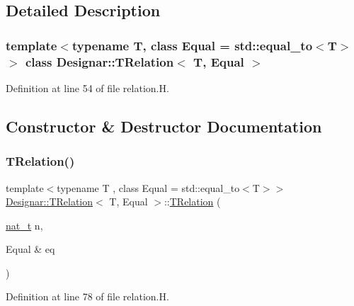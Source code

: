 \subsection{Detailed Description}
\subsubsection*{template$<$typename T, class Equal = std\+::equal\+\_\+to$<$\+T$>$$>$\newline
class Designar\+::\+T\+Relation$<$ T, Equal $>$}



Definition at line 54 of file relation.\+H.



\subsection{Constructor \& Destructor Documentation}
\mbox{\label{class_designar_1_1_t_relation_a1f409c1d5959b2771c31e1f7e92664cf}} 
\subsubsection{\texorpdfstring{T\+Relation()}{TRelation()}\hspace{0.1cm}{\footnotesize\ttfamily [1/4]}}
{\footnotesize\ttfamily template$<$typename T , class Equal  = std\+::equal\+\_\+to$<$\+T$>$$>$ \\
\hyperlink{class_designar_1_1_t_relation}{Designar\+::\+T\+Relation}$<$ T, Equal $>$\+::\hyperlink{class_designar_1_1_t_relation}{T\+Relation} (\begin{DoxyParamCaption}\item[{\hyperlink{namespace_designar_aa72662848b9f4815e7bf31a7cf3e33d1}{nat\+\_\+t}}]{n,  }\item[{Equal \&}]{eq }\end{DoxyParamCaption})\hspace{0.3cm}{\ttfamily [inline]}}



Definition at line 78 of file relation.\+H.

\mbox{\label{class_designar_1_1_t_relation_ab6e9dc668ef079b565153eb49b45629c}} 
